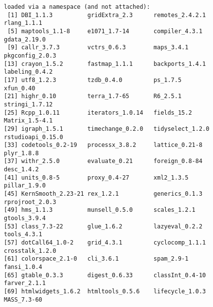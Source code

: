\documentclass{article}\usepackage[]{graphicx}\usepackage[]{xcolor}
\makeatletter
\newenvironment{kframe}{%
 \def\at@end@of@kframe{}%
 \ifinner\ifhmode%
  \def\at@end@of@kframe{\end{minipage}}%
  \begin{minipage}{\columnwidth}%
 \fi\fi%
 \def\FrameCommand##1{\hskip\@totalleftmargin \hskip-\fboxsep
 \colorbox{shadecolor}{##1}\hskip-\fboxsep
     \hskip-\linewidth \hskip-\@totalleftmargin \hskip\columnwidth}%
 \MakeFramed {\advance\hsize-\width
   \@totalleftmargin\z@ \linewidth\hsize
   \@setminipage}}%
 {\par\unskip\endMakeFramed%
 \at@end@of@kframe}
\newenvironment{knitrout}{}{} %
\makeatother
\begin{document}
\begin{knitrout}
\begin{kframe}
\begin{verbatim}
loaded via a namespace (and not attached):
 [1] DBI_1.1.3          gridExtra_2.3      remotes_2.4.2.1    rlang_1.1.1       
 [5] maptools_1.1-8     e1071_1.7-14       compiler_4.3.1     gdata_2.19.0      
 [9] callr_3.7.3        vctrs_0.6.3        maps_3.4.1         pkgconfig_2.0.3   
[13] crayon_1.5.2       fastmap_1.1.1      backports_1.4.1    labeling_0.4.2    
[17] utf8_1.2.3         tzdb_0.4.0         ps_1.7.5           xfun_0.40         
[21] highr_0.10         terra_1.7-65       R6_2.5.1           stringi_1.7.12    
[25] Rcpp_1.0.11        iterators_1.0.14   fields_15.2        Matrix_1.5-4.1    
[29] igraph_1.5.1       timechange_0.2.0   tidyselect_1.2.0   rstudioapi_0.15.0 
[33] codetools_0.2-19   processx_3.8.2     lattice_0.21-8     plyr_1.8.8        
[37] withr_2.5.0        evaluate_0.21      foreign_0.8-84     desc_1.4.2        
[41] units_0.8-5        proxy_0.4-27       xml2_1.3.5         pillar_1.9.0      
[45] KernSmooth_2.23-21 rex_1.2.1          generics_0.1.3     rprojroot_2.0.3   
[49] hms_1.1.3          munsell_0.5.0      scales_1.2.1       gtools_3.9.4      
[53] class_7.3-22       glue_1.6.2         lazyeval_0.2.2     tools_4.3.1       
[57] dotCall64_1.0-2    grid_4.3.1         cyclocomp_1.1.1    crosstalk_1.2.0   
[61] colorspace_2.1-0   cli_3.6.1          spam_2.9-1         fansi_1.0.4       
[65] gtable_0.3.3       digest_0.6.33      classInt_0.4-10    farver_2.1.1      
[69] htmlwidgets_1.6.2  htmltools_0.5.6    lifecycle_1.0.3    MASS_7.3-60       
\end{verbatim}
\end{kframe}
\end{knitrout}

\newpage
\printbibliography[heading=bibintoc]
\end{document}
